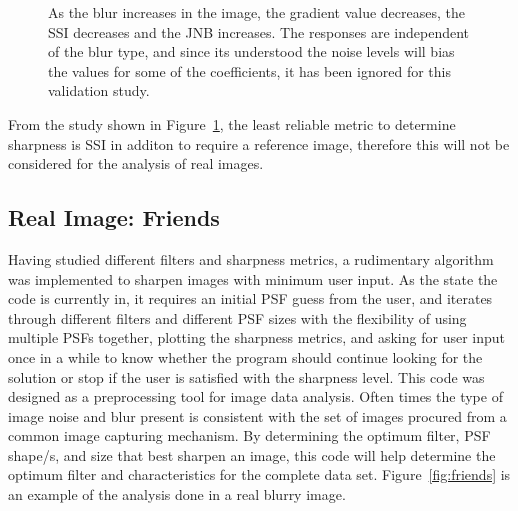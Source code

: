 \begin{figure}[h!]
        \caption{As the blur increases in the image, the gradient value decreases, the SSI decreases and the JNB increases. The responses are independent of the blur type, and since its understood the noise levels will bias the values for some of the  coefficients, it has been ignored for this validation study.} \label{fig:train_metrics}
\end{figure}

\noindent From the study shown in Figure~\ref{fig:train_metrics}, the least reliable metric to determine sharpness is SSI in additon to require a reference image, therefore this will not be considered for the analysis of real images.

\subsection{Real Image: Friends}
Having studied different filters and sharpness metrics, a rudimentary algorithm was implemented to sharpen images with minimum user input. As the state the code is currently in, it requires an initial PSF guess from the user, and iterates through different filters and different PSF sizes with the flexibility of using multiple PSFs together, plotting the sharpness metrics, and asking for user input once in a while to know whether the program should continue looking for the solution or stop if the user is satisfied with the sharpness level. This code was designed as a preprocessing tool for image data analysis. Often times the type of image noise and blur present is consistent with the set of images procured from a common image capturing mechanism. By determining the optimum filter, PSF shape/s, and size that best sharpen an image, this code will help determine the optimum filter and characteristics for the complete data set. Figure~\ref{fig:friends} is an example of the analysis done in a real blurry image.

